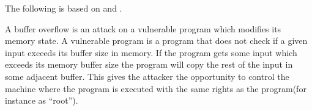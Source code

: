 The following is based on \citet[p. 18]{foster2005buffer} and \citet[Section 1.1]{ruwase2004practical}.

A buffer overflow is an attack on a vulnerable program which modifies its memory state.
A vulnerable program is a program that does not check if a given input exceeds its buffer size in memory.
If the program gets some input which exceeds its memory buffer size the program will copy the rest of the input in some adjacent buffer.
This gives the attacker the opportunity to control the machine where the program is executed with the same rights as the program(for instance as ``root'').

